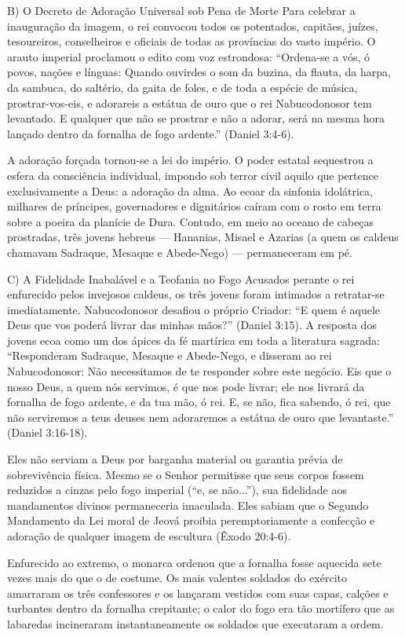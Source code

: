 B) O Decreto de Adoração Universal sob Pena de Morte
Para celebrar a inauguração da imagem, o rei convocou todos os potentados, capitães, juízes, tesoureiros, conselheiros e oficiais de todas as províncias do vasto império. O arauto imperial proclamou o edito com voz estrondosa:
``Ordena-se a vós, ó povos, nações e línguas: Quando ouvirdes o som da buzina, da flauta, da harpa, da sambuca, do saltério, da gaita de foles, e de toda a espécie de música, prostrar-vos-eis, e adorareis a estátua de ouro que o rei Nabucodonosor tem levantado. E qualquer que não se prostrar e não a adorar, será na mesma hora lançado dentro da fornalha de fogo ardente.'' (Daniel 3:4-6).

A adoração forçada tornou-se a lei do império. O poder estatal sequestrou a esfera da consciência individual, impondo sob terror civil aquilo que pertence exclusivamente a Deus: a adoração da alma. Ao ecoar da sinfonia idolátrica, milhares de príncipes, governadores e dignitários caíram com o rosto em terra sobre a poeira da planície de Dura. Contudo, em meio ao oceano de cabeças prostradas, três jovens hebreus — Hananias, Misael e Azarias (a quem os caldeus chamavam Sadraque, Mesaque e Abede-Nego) — permaneceram em pé.

C) A Fidelidade Inabalável e a Teofania no Fogo
Acusados perante o rei enfurecido pelos invejosos caldeus, os três jovens foram intimados a retratar-se imediatamente. Nabucodonosor desafiou o próprio Criador: ``E quem é aquele Deus que vos poderá livrar das minhas mãos?'' (Daniel 3:15).
A resposta dos jovens ecoa como um dos ápices da fé martírica em toda a literatura sagrada:
``Responderam Sadraque, Mesaque e Abede-Nego, e disseram ao rei Nabucodonosor: Não necessitamos de te responder sobre este negócio. Eis que o nosso Deus, a quem nós servimos, é que nos pode livrar; ele nos livrará da fornalha de fogo ardente, e da tua mão, ó rei. E, se não, fica sabendo, ó rei, que não serviremos a teus deuses nem adoraremos a estátua de ouro que levantaste.'' (Daniel 3:16-18).

Eles não serviam a Deus por barganha material ou garantia prévia de sobrevivência física. Mesmo se o Senhor permitisse que seus corpos fossem reduzidos a cinzas pelo fogo imperial (``e, se não...''), sua fidelidade aos mandamentos divinos permaneceria imaculada. Eles sabiam que o Segundo Mandamento da Lei moral de Jeová proibia peremptoriamente a confecção e adoração de qualquer imagem de escultura (Êxodo 20:4-6).

Enfurecido ao extremo, o monarca ordenou que a fornalha fosse aquecida sete vezes mais do que o de costume. Os mais valentes soldados do exército amarraram os três confessores e os lançaram vestidos com suas capas, calções e turbantes dentro da fornalha crepitante; o calor do fogo era tão mortífero que as labaredas incineraram instantaneamente os soldados que executaram a ordem.

